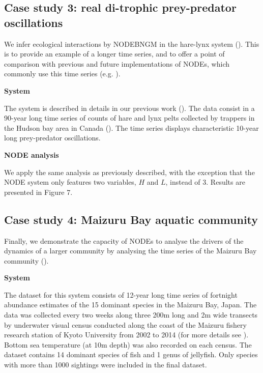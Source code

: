 \documentclass[11pt, oneside]{article}
\begin{document}
\subsection{Case study 3: real di-trophic prey-predator oscillations}

We infer ecological interactions by NODEBNGM in the hare-lynx system (\cite{Odum1972}).
This is to provide an example of a longer time series, and to offer a point of comparison with previous and future implementations of NODEs, which commonly use this time series (e.g. \cite{Bonnaffe2021a,Frank2022}).

\textbf{System}

The system is described in details in our previous work (\cite{Bonnaffe2021a}).
The data consist in a 90-year long time series of counts of hare and lynx pelts collected by trappers in the Hudson bay area in Canada (\cite{Odum1972}).
The time series displays characteristic 10-year long prey-predator oscillations.

\textbf{NODE analysis}

We apply the same analysis as previously described, with the exception that the NODE system only features two variables, $H$ and $L$, instead of 3.
Results are presented in Figure 7.

\subsection{Case study 4: Maizuru Bay aquatic community}

Finally, we demonstrate the capacity of NODEs to analyse the drivers of the dynamics of a larger community by analysing the time series of the Maizuru Bay community (\cite{Ushio2018}).

\textbf{System}

The dataset for this system consists of 12-year long time series of fortnight abundance estimates of the 15 dominant species in the Maizuru Bay, Japan. 
The data was collected every two weeks along three 200m long and 2m wide transects by underwater visual census conducted along the coast of the Maizuru fishery research station of Kyoto University from 2002 to 2014 (for more details see \cite{Ushio2018}).
Bottom sea temperature (at 10m depth) was also recorded on each census.
The dataset contains 14 dominant species of fish and 1 genus of jellyfish.
Only species with more than 1000 sightings were included in the final dataset. 
\end{document}
